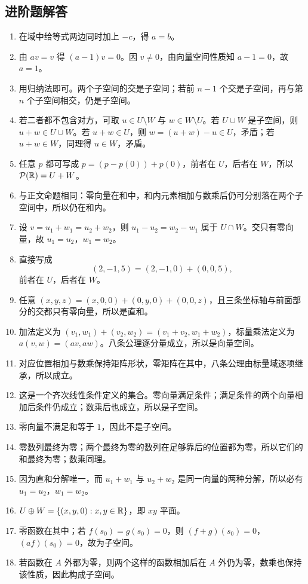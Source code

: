 \subsection*{进阶题解答} \begin{enumerate}[label=\textbf{\arabic*.},start=21]
\item 在域中给等式两边同时加上 $-c$，得 $a=b$。 \item 由 $av=v$ 得 $(a-1)v=0$。因 $v\neq 0$，由向量空间性质知 $a-1=0$，故 $a=1$。
\item 用归纳法即可。两个子空间的交是子空间；若前 $n-1$ 个交是子空间，再与第 $n$ 个子空间相交，仍是子空间。 \item 若二者都不包含对方，可取 $u\in U\setminus W$ 与 $w\in W\setminus U$。若 $U\cup W$ 是子空间，则 $u+w\in U\cup W$。若 $u+w\in U$，则 $w=(u+w)-u\in U$，矛盾；若 $u+w\in W$，同理得 $u\in W$，矛盾。
\item 任意 $p$ 都可写成 $p=(p-p(0))+p(0)$，前者在 $U$，后者在 $W$，所以 $\mathcal{P}(\mathbb{R})=U+W$。 \item 与正文命题相同：零向量在和中，和内元素相加与数乘后仍可分别落在两个子空间中，所以仍在和内。
\item 设 $v=u_1+w_1=u_2+w_2$，则 $u_1-u_2=w_2-w_1$ 属于 $U\cap W$。交只有零向量，故 $u_1=u_2$，$w_1=w_2$。 \item 直接写成
\[ (2,-1,5)=(2,-1,0)+(0,0,5),
\] 前者在 $U$，后者在 $W$。
\item 任意 $(x,y,z)=(x,0,0)+(0,y,0)+(0,0,z)$，且三条坐标轴与前面部分的交都只有零向量，所以是直和。 \item 加法定义为 $(v_1,w_1)+(v_2,w_2)=(v_1+v_2,w_1+w_2)$，标量乘法定义为 $a(v,w)=(av,aw)$。八条公理逐分量成立，所以是向量空间。
\item 对应位置相加与数乘保持矩阵形状，零矩阵在其中，八条公理由标量域逐项继承，所以成立。 \item 这是一个齐次线性条件定义的集合。零向量满足条件；满足条件的两个向量相加后条件仍成立；数乘后也成立，所以是子空间。
\item 零向量不满足和等于 $1$，因此不是子空间。 \item 零数列最终为零；两个最终为零的数列在足够靠后的位置都为零，所以它们的和最终为零；数乘同理。
\item 因为直和分解唯一，而 $u_1+w_1$ 与 $u_2+w_2$ 是同一向量的两种分解，所以必有 $u_1=u_2$，$w_1=w_2$。 \item $U\oplus W=\{(x,y,0):x,y\in\mathbb{R}\}$，即 $xy$ 平面。
\item 零函数在其中；若 $f(s_0)=g(s_0)=0$，则 $(f+g)(s_0)=0$，$(af)(s_0)=0$，故为子空间。 \item 若函数在 $A$ 外都为零，则两个这样的函数相加后在 $A$ 外仍为零，数乘也保持该性质，因此构成子空间。

\end{enumerate}
